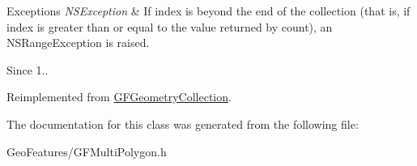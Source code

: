 \begin{DoxyExceptions}{Exceptions}
{\em N\+S\+Exception} & If index is beyond the end of the collection (that is, if index is greater than or equal to the value returned by count), an N\+S\+Range\+Exception is raised.\\
\hline
\end{DoxyExceptions}
\begin{DoxySince}{Since}
1.. 
\end{DoxySince}


Reimplemented from \hyperlink{interface_g_f_geometry_collection_ac67dd4526580a8a38408e39c489a7503}{G\+F\+Geometry\+Collection}.



The documentation for this class was generated from the following file\+:\begin{DoxyCompactItemize}
\item 
Geo\+Features/G\+F\+Multi\+Polygon.\+h\end{DoxyCompactItemize}
